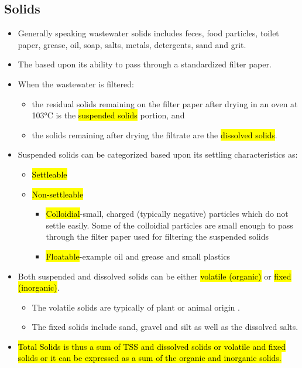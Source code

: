 \subsection{Solids}
		\begin{itemize}
		\item Generally speaking wastewater solids includes feces, food particles, toilet paper, grease, oil, soap, salts, metals, detergents, sand and grit.
			\item The  based upon its ability to pass through a standardized filter paper.
			\item When the wastewater is filtered:
			      \begin{itemize}
			      	\item the residual solids remaining on the filter paper after drying in an oven at 103\si{\degree}C is the \hl{suspended solids} portion, and 
			      	\item the solids remaining after drying the filtrate are the \hl{dissolved solids}.
			      \end{itemize}
			\item Suspended solids can be categorized based upon its settling characteristics as:
			      \begin{itemize}
			      	\item \hl{Settleable}
			      	\item \hl{Non-settleable}
			      	      \begin{itemize}
			      	      	\item \hl{Colloidial}-small, charged (typically negative) particles which do not settle easily.  Some of the colloidial particles are small enough to pass through the filter paper used for filtering the suspended solids
			      	      	\item \hl{Floatable}-example oil and grease and small plastics
			      	      \end{itemize}
			      \end{itemize}
			\item Both suspended and dissolved solids can be either \hl{volatile (organic)} or \hl{fixed (inorganic)}.

			      \begin{itemize}
			      	\item The volatile solids are typically of plant or animal origin .
			      	\item The fixed solids include sand, gravel and silt as well as the dissolved salts.
			      \end{itemize}
			     \item \hl{Total Solids is thus a sum of TSS and dissolved solids or volatile and fixed solids or it can be expressed as a sum of the organic and inorganic solids.}
			      \end{itemize}

